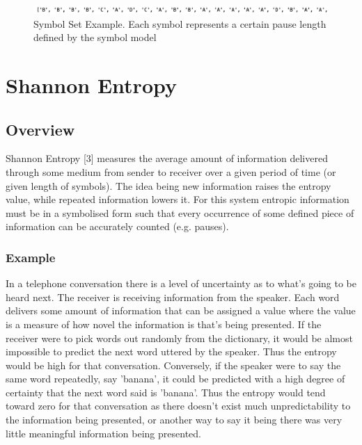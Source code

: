 \begin{figure}[h]
	\label{fig:example_pause-code-symbol}
%
	\center
	\includegraphics[scale=0.6]{src/main-matter/theory/fig/output_symbols}
	\caption{Symbol Set Example. Each symbol represents a certain pause length defined by the symbol model}
	\label{fig:example_symbol_set}
\end{figure}


\section{Shannon Entropy}
\subsection{Overview}
Shannon Entropy [3] measures the average amount of information delivered through some medium from sender to receiver over a given period of time (or given length of symbols). The idea being new information raises the entropy value, while repeated information lowers it. For this system entropic information must be in a symbolised form such that every occurrence of some defined piece of information can be accurately counted (e.g. pauses).

\subsubsection{Example}
In a telephone conversation there is a level of uncertainty as to what's going to be heard next. The receiver is receiving information from the speaker. Each word delivers some amount of information that can be assigned a value where the value is a measure of how novel the information is that's being presented. If the receiver were to pick words out randomly from the dictionary, it would be almost impossible to predict the next word uttered by the speaker. Thus the entropy would be high for that conversation. Conversely, if the speaker were to say the same word repeatedly, say 'banana', it could be predicted with a high degree of certainty that the next word said is 'banana'. Thus the entropy would tend toward zero for that conversation as there doesn't exist much unpredictability to the information being presented, or another way to say it being there was very little meaningful information being presented.\\

